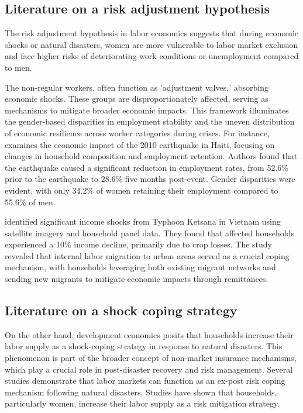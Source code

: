 \documentclass[a4paper,12pt]{article}
\begin{document}
\subsection{Literature on a risk adjustment hypothesis}
\label{sec5.1}


The risk adjustment hypothesis in labor economics suggests that during economic shocks or natural disasters, women are more vulnerable to labor market exclusion and face higher risks of deteriorating work conditions or unemployment compared to men. 


The non-regular workers, often function as 'adjustment valves,' absorbing economic shocks. These groups are disproportionately affected, serving as mechanisms to mitigate broader economic impacts. This framework illuminates the gender-based disparities in employment stability and the uneven distribution of economic resilience across worker categories during crises. For instance, \citet{Kim2014ARetention} examines the economic impact of the 2010 earthquake in Haiti, focusing on changes in household composition and employment retention. Authors found that the earthquake caused a significant reduction in employment rates, from 52.6\% prior to the earthquake to 28.6\% five months post-event. Gender disparities were evident, with only 34.2\% of women retaining their employment compared to 55.6\% of men. 


\citet{Groger2016InternalTyphoon} identified significant income shocks from Typhoon Ketsana in Vietnam using satellite imagery and household panel data. They found that affected households experienced a 10\% income decline, primarily due to crop losses. The study revealed that internal labor migration to urban areas served as a crucial coping mechanism, with households leveraging both existing migrant networks and sending new migrants to mitigate economic impacts through remittances.

\subsection{Literature on a shock coping strategy}
\label{sec5.1}

On the other hand, development economics posits that households increase their labor supply as a shock-coping strategy in response to natural disasters. This phenomenon is part of the broader concept of non-market insurance mechanisms, which play a crucial role in post-disaster recovery and risk management. Several studies demonstrate that labor markets can function as an ex-post risk coping mechanism following natural disasters. Studies have shown that households, particularly women, increase their labor supply as a risk mitigation strategy. 
\end{document}
